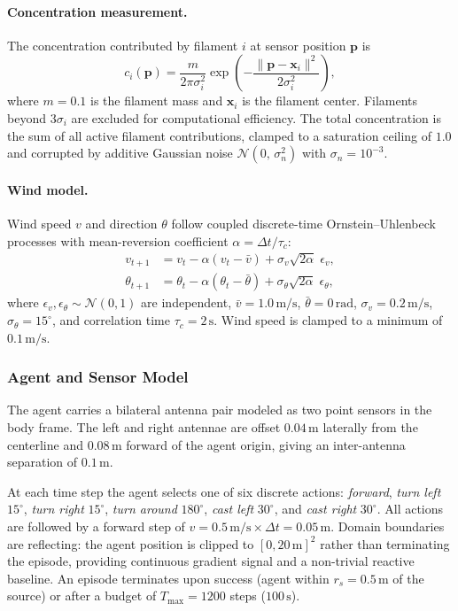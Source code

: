 \paragraph{Concentration measurement.}
The concentration contributed by filament $i$ at sensor position
$\mathbf{p}$ is
\begin{equation}
  c_i(\mathbf{p}) = \frac{m}{2\pi\sigma_i^2}
    \exp\!\left(-\frac{\|\mathbf{p} - \mathbf{x}_i\|^2}{2\sigma_i^2}\right),
  \label{eq:filament_conc}
\end{equation}
where $m = 0.1$ is the filament mass and $\mathbf{x}_i$ is the filament
center.  Filaments beyond $3\sigma_i$ are excluded for computational
efficiency.  The total concentration is the sum of all active filament
contributions, clamped to a saturation ceiling of $1.0$ and corrupted by
additive Gaussian noise $\mathcal{N}(0,\,\sigma_n^2)$ with
$\sigma_n = 10^{-3}$.

\paragraph{Wind model.}
Wind speed $v$ and direction $\theta$ follow coupled discrete-time
Ornstein--Uhlenbeck processes with mean-reversion coefficient
$\alpha = \Delta t / \tau_c$:
\begin{align}
  v_{t+1}   &= v_t - \alpha(v_t - \bar{v}) +
               \sigma_v \sqrt{2\alpha}\;\epsilon_v, \\
  \theta_{t+1} &= \theta_t - \alpha(\theta_t - \bar{\theta}) +
               \sigma_\theta \sqrt{2\alpha}\;\epsilon_\theta,
\end{align}
where $\epsilon_v, \epsilon_\theta \sim \mathcal{N}(0,1)$ are independent,
$\bar{v} = 1.0\,\text{m/s}$, $\bar{\theta} = 0\,\text{rad}$,
$\sigma_v = 0.2\,\text{m/s}$, $\sigma_\theta = 15^\circ$, and correlation
time $\tau_c = 2\,\text{s}$.  Wind speed is clamped to a minimum of
$0.1\,\text{m/s}$.

\subsubsection{Agent and Sensor Model}

The agent carries a bilateral antenna pair modeled as two point sensors in
the body frame.  The left and right antennae are offset $0.04\,\text{m}$
laterally from the centerline and $0.08\,\text{m}$ forward of the agent
origin, giving an inter-antenna separation of $0.1\,\text{m}$.

At each time step the agent selects one of six discrete actions:
\textit{forward}, \textit{turn left} $15^\circ$, \textit{turn right}
$15^\circ$, \textit{turn around} $180^\circ$, \textit{cast left}
$30^\circ$, and \textit{cast right} $30^\circ$.  All actions are followed
by a forward step of $v = 0.5\,\text{m/s} \times \Delta t = 0.05\,\text{m}$.
Domain boundaries are reflecting: the agent position is clipped to
$[0, 20\,\text{m}]^2$ rather than terminating the episode, providing
continuous gradient signal and a non-trivial reactive baseline.  An episode
terminates upon success (agent within $r_s = 0.5\,\text{m}$ of the source)
or after a budget of $T_{\max} = 1200$ steps ($100\,\text{s}$).

